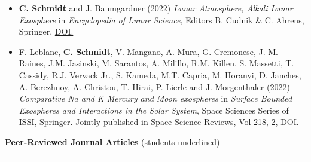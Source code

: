 \documentclass[12pt]{report}
\begin{document}
\begin{itemize} \itemsep -2pt %
  \item \textbf{C. Schmidt} and J. Baumgardner (2022) \textit{Lunar Atmosphere, Alkali Lunar Exosphere} in \textit{Encyclopedia of Lunar Science}, Editors B. Cudnik \& C. Ahrens, Springer, \href{https://doi.org/10.1007/978-3-319-05546-6_230-1}{DOI.}
  \item F. Leblanc, \textbf{C. Schmidt}, V. Mangano, A. Mura, G. Cremonese, J. M. Raines, J.M. Jasinski, M. Sarantos, A. Milillo, R.M. Killen, S. Massetti, T. Cassidy, R.J. Vervack Jr., S. Kameda, M.T. Capria, M. Horanyi, D. Janches, A. Berezhnoy, A. Christou, T. Hirai, \underline{P. Lierle} and J. Morgenthaler (2022) \textit{Comparative Na and K Mercury and Moon exospheres} in \textit{Surface Bounded Exospheres and Interactions in the Solar System}, Space Sciences Series of ISSI, Springer. Jointly published in Space Science Reviews, Vol 218, 2, \href{https://doi.org/10.1007/s11214-022-00871-w}{DOI.}
 \end{itemize}
\vspace{2 mm}
\noindent\textbf{Peer-Reviewed Journal Articles} (students underlined) \rm\hspace*{\fill} \\
\rule{\textwidth}{1pt}
\end{document}

